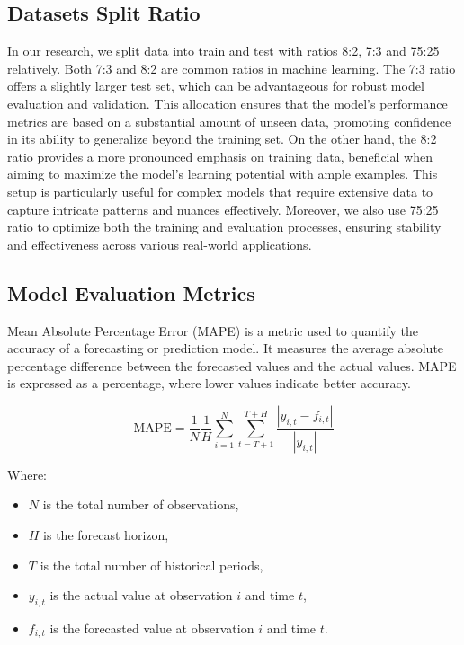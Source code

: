 \documentclass{ieeeojies}
\begin{document}
\subsection{Datasets Split Ratio}
In our research, we split data into train and test with ratios 8:2, 7:3 and 75:25 relatively. Both 7:3 and 8:2 are common ratios in machine learning. The 7:3 ratio offers a slightly larger test set, which can be advantageous for robust model evaluation and validation. This allocation ensures that the model's performance metrics are based on a substantial amount of unseen data, promoting confidence in its ability to generalize beyond the training set. On the other hand, the 8:2 ratio provides a more pronounced emphasis on training data, beneficial when aiming to maximize the model's learning potential with ample examples. This setup is particularly useful for complex models that require extensive data to capture intricate patterns and nuances effectively. Moreover, we also use 75:25 ratio to optimize both the training and evaluation processes, ensuring stability and effectiveness across various real-world applications.
\subsection{Model Evaluation Metrics}
Mean Absolute Percentage Error (MAPE) is a metric used to quantify the accuracy of a forecasting or prediction model. It measures the average absolute percentage difference between the forecasted values and the actual values. MAPE is expressed as a percentage, where lower values indicate better accuracy. 

\begin{equation}
\text{MAPE} = \frac{1}{N} \frac{1}{H} \sum_{i=1}^{N} \sum_{t=T+1}^{T+H} \frac{| y_{i,t} - f_{i,t} |}{| y_{i,t} |}
\end{equation}

Where:
\begin{itemize}
    \item \( N \) is the total number of observations,
    \item \( H \) is the forecast horizon,
    \item \( T \) is the total number of historical periods,
    \item \( y_{i,t} \) is the actual value at observation \( i \) and time \( t \),
    \item \( f_{i,t} \) is the forecasted value at observation \( i \) and time \( t \).
\end{itemize}
\end{document}
